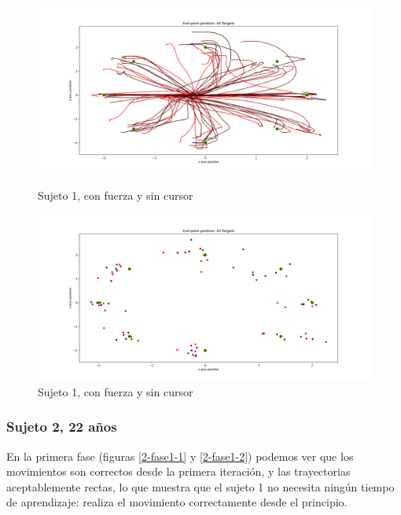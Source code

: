 \documentclass[a4paper,11pt, oneside]{book}
\begin{document}
\begin{figure}[H]
	\begin{minipage}[b]{0.5\linewidth}
		\centering
		\includegraphics[width=\linewidth]{sujeto1/force_no_cursor/trayectorias}
		\caption{Sujeto 1, con fuerza y sin cursor}
		\label{1-fase4-1}
	\end{minipage}
	\hspace{0.5cm}
	\begin{minipage}[b]{0.5\linewidth}
		\centering
		\includegraphics[width=\linewidth]{sujeto1/force_no_cursor/trayectorias_puntos}
		\caption{Sujeto 1, con fuerza y sin cursor}
		\label{1-fase4-2}
	\end{minipage}
\end{figure}


\subsubsection{Sujeto 2, 22 años}

En la primera fase (figuras \ref{2-fase1-1} y \ref{2-fase1-2}) podemos ver que los movimientos son correctos desde la primera iteración, y las trayectorias aceptablemente rectas, lo que muestra que el sujeto 1 no necesita ningún tiempo de aprendizaje: realiza el movimiento correctamente desde el principio.
\end{document}
